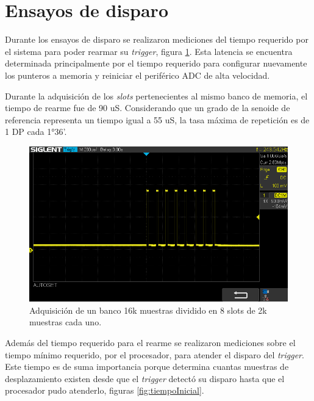 \section{Ensayos de disparo}
Durante los ensayos de disparo se realizaron mediciones del tiempo requerido por el sistema para poder rearmar su \textit{trigger}, figura \ref{fig:oscDisparos}. Esta latencia se encuentra determinada principalmente por el tiempo requerido para configurar nuevamente los punteros a memoria y reiniciar el periférico ADC de alta velocidad. 

Durante la adquisición de los \textit{slots} pertenecientes al mismo banco de memoria, el tiempo de rearme fue de 90 uS. Considerando que un grado de la senoide de referencia representa un tiempo igual a 55 uS, la tasa máxima de repetición es de 1 DP cada 1°36’.


\vspace{5mm}

\begin{figure}[ht]
	\centering
	\includegraphics[width=140mm]{./Figures/disparos.png}
	\caption{Adquisición de un banco 16k muestras dividido en 8 slots de 2k muestras cada uno.}
	\label{fig:oscDisparos}
\end{figure}

\vspace{5mm}

\newpage

Además del tiempo requerido para el rearme se realizaron mediciones sobre el tiempo mínimo requerido, por el procesador, para atender el disparo del \textit{trigger}. Este tiempo es de suma importancia porque determina cuantas muestras de desplazamiento existen desde que el \textit{trigger} detectó su disparo hasta que el procesador pudo atenderlo, figuras \ref{fig:tiempoInicial}. 

